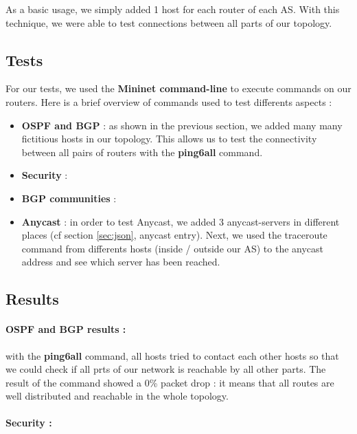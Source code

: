 \documentclass[letter, 9pt, conference]{ieeeconf}
\begin{document}
As a basic usage, we simply added 1 host for each router of each AS. With this technique, we were able to test connections between all parts of our topology. 

\subsection{Tests}

For our tests, we used the \textbf{Mininet command-line} to execute commands on our routers. Here is a brief overview of commands used to test differents aspects : 

\begin{itemize}
    \item \textbf{OSPF and BGP} : as shown in the previous section, we added many many fictitious hosts in our topology. This allows us to test the connectivity between all pairs of routers with the \textbf{ping6all} command. 
    
    \item \textbf{Security} : 
    
    \item \textbf{BGP communities} : 
    
    \item \textbf{Anycast} : in order to test Anycast, we added 3 anycast-servers in different places (cf section \ref{sec:json}, anycast entry). Next, we used the traceroute command from differents hosts (inside / outside our AS) to the anycast address and see which server has been reached. 
\end{itemize}

\subsection{Results}

\paragraph{OSPF and BGP results :} with the \textbf{ping6all} command, all hosts tried to contact each other hosts so that we could check if all prts of our network is reachable by all other parts. The result of the command showed a 0\% packet drop : it means that all routes are well distributed and reachable in the whole topology. 

\paragraph{Security :}
\end{document}
